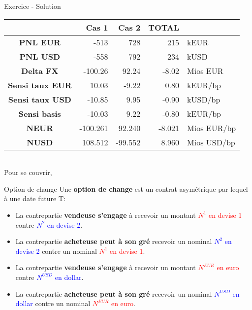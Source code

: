 \documentclass{beamer}
\begin{document}
\begin{frame}{Exercice - Solution}

\begin{tabular}{|c|r|r|r|l|}
\hline
&\textbf{Cas 1}&\textbf{Cas 2}&\textbf{TOTAL}& \\
\hline
\hline
\textbf{PNL EUR} &-513&728&215&kEUR\\
\textbf{PNL USD} &-558&792&234&kUSD\\
\hline
\hline
\textbf{Delta FX} &-100.26&92.24&-8.02&Mios EUR\\
\textbf{Sensi taux EUR} &10.03&-9.22&0.80&kEUR/bp\\
\textbf{Sensi taux USD} &-10.85&9.95&-0.90&kUSD/bp\\
\textbf{Sensi basis} &-10.03&9.22&-0.80&kEUR/bp\\
\hline
\hline
\textbf{NEUR} &-100.261&92.240&-8.021&Mios EUR/bp\\
\textbf{NUSD} &108.512&-99.552&8.960&Mios USD/bp\\
\hline
\end{tabular}
\\
\vspace{0.5cm}
Pour se couvrir, 
\end{frame}

\begin{frame}{Option de change}
Une \textbf{option de change} est un contrat asymétrique par lequel à une date future T:\\
\vspace{0.5cm}
\begin{overprint}
\begin{itemize}
\item La contrepartie \textbf{vendeuse s'engage} à recevoir un montant \textcolor{red}{$N^1$ en devise 1} contre \textcolor{blue}{$N^2$ en devise 2}.
\item La contrepartie \textbf{acheteuse peut à son gré} recevoir un nominal \textcolor{blue}{$N^2$ en devise 2} contre un nominal \textcolor{red}{$N^1$ en devise 1}.
\end{itemize}
\begin{itemize}
\item La contrepartie \textbf{vendeuse s'engage} à recevoir un montant \textcolor{red}{$N^{EUR}$ en euro} contre \textcolor{blue}{$N^{USD}$ en dollar}.
\item La contrepartie \textbf{acheteuse peut à son gré} recevoir un nominal \textcolor{blue}{$N^{USD}$ en dollar} contre un nominal \textcolor{red}{$N^{EUR}$ en euro}.
\end{itemize}
\end{overprint}
\end{frame}
\end{document}
